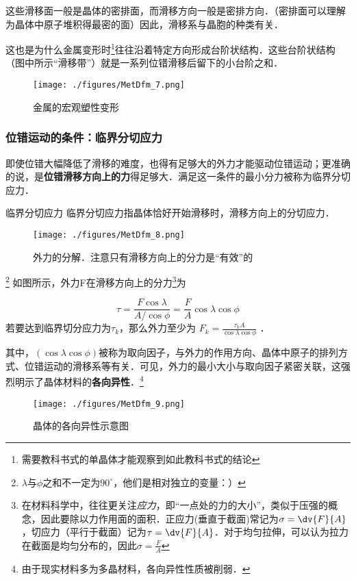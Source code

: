 这些滑移面一般是晶体的密排面，而滑移方向一般是密排方向．（密排面可以理解为晶体中原子堆积得最密的面）因此，滑移系与晶胞的种类有关．

这也是为什么金属变形时\footnote{需要教科书式的单晶体才能观察到如此教科书式的结论}往往沿着特定方向形成台阶状结构．这些台阶状结构（图中所示“滑移带”）就是一系列位错滑移后留下的小台阶之和．
\begin{figure}[ht]
\centering
\texttt{[image: ./figures/MetDfm\_7.png]}
\caption{金属的宏观塑性变形} \label{MetDfm_fig7}
\end{figure}

\subsubsection{位错运动的条件：临界分切应力}
即使位错大幅降低了滑移的难度，也得有足够大的外力才能驱动位错运动；更准确的说，是\textbf{位错滑移方向上的力}得足够大．满足这一条件的最小分力被称为临界分切应力．

\begin{definition}{临界分切应力}
临界分切应力指晶体恰好开始滑移时，滑移方向上的分切应力．
\end{definition}

\begin{figure}[ht]
\centering
\texttt{[image: ./figures/MetDfm\_8.png]}
\caption{外力的分解．注意只有滑移方向上的分力是“有效”的} \label{MetDfm_fig8}
\end{figure}
\footnote{$\lambda$与$\phi$之和不一定为$90^\circ$，他们是相对独立的变量：）}
如图所示，外力F在滑移方向上的分力\footnote{在材料科学中，往往更关注\textsl{应力}，即“一点处的力的大小”，类似于压强的概念，因此要除以力作用面的面积．正应力(垂直于截面)常记为$\sigma=\dv{F}{A}$，切应力（平行于截面）记为$\tau=\dv{F}{A}$．对于均匀拉伸，可以认为拉力在截面是均匀分布的，因此$\sigma=\frac{F}{A}$}为

$$\tau=\frac{F \cos \lambda}{A/{\cos \phi}}=\frac{F}{A}{\cos \lambda}{\cos \phi}$$
若要达到临界切分应力为$\tau_k$，那么外力至少为 $F_k=\frac{\tau_k A}{\cos \lambda \cos \phi} $ ．

其中，$(\cos \lambda \cos \phi)$被称为取向因子，与外力的作用方向、晶体中原子的排列方式、位错运动的滑移系等有关．可见，外力的最小大小与取向因子紧密关联，这强烈明示了晶体材料的\textbf{各向异性}．\footnote{由于现实材料多为多晶材料，各向异性性质被削弱．}

\begin{figure}[ht]
\centering
\texttt{[image: ./figures/MetDfm\_9.png]}
\caption{晶体的各向异性示意图} \label{MetDfm_fig9}
\end{figure}
